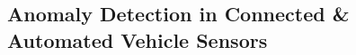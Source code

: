 \documentclass[]{Keval-resume}
\begin{document}

\subsection{Anomaly Detection in Connected \& Automated Vehicle Sensors \hfill \normalfont
}
\end{document}
